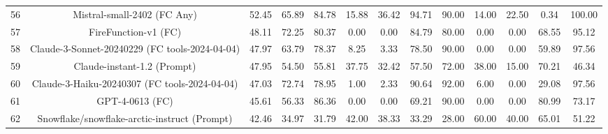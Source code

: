 \documentclass{article}
\begin{document}
\begin{table}[h]
{\begin{tabular}{ccccccccccccc}
56                     & Mistral-small-2402 (FC Any)                    & 52.45                         & 65.89  & 84.78    & 15.88    & 36.42                                                       & 94.71  & 90.00    & 14.00    & 22.50                                                       & 0.34                          & 100.00                      \\
57                     & FireFunction-v1 (FC)                           & 48.11                         & 72.25  & 80.37    & 0.00     & 0.00                                                        & 84.79  & 80.00    & 0.00     & 0.00                                                        & 68.55                         & 95.12                       \\
58                     & Claude-3-Sonnet-20240229 (FC tools-2024-04-04) & 47.97                         & 63.79  & 78.37    & 8.25     & 3.33                                                        & 78.50  & 90.00    & 0.00     & 0.00                                                        & 59.89                         & 97.56                       \\
59                     & Claude-instant-1.2 (Prompt)                    & 47.95                         & 54.50  & 55.81    & 37.75    & 32.42                                                       & 57.50  & 72.00    & 38.00    & 15.00                                                       & 70.21                         & 46.34                       \\
60                     & Claude-3-Haiku-20240307 (FC tools-2024-04-04)  & 47.03                         & 72.74  & 78.95    & 1.00     & 2.33                                                        & 90.64  & 92.00    & 6.00     & 0.00                                                        & 29.08                         & 97.56                       \\
61                     & GPT-4-0613 (FC)                                & 45.61                         & 56.33  & 86.36    & 0.00     & 0.00                                                        & 69.21  & 90.00    & 0.00     & 0.00                                                        & 80.99                         & 73.17                       \\
62                     & Snowflake/snowflake-arctic-instruct (Prompt)   & 42.46                         & 34.97  & 31.79    & 42.00    & 38.33                                                       & 33.29  & 28.00    & 60.00    & 40.00                                                       & 65.01                         & 51.22                       \\

\end{tabular}}
\end{table}
\end{document}
